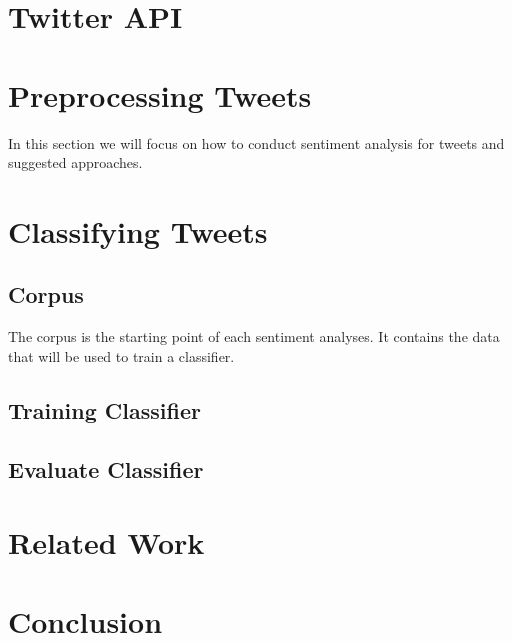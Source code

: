 \documentclass{acm_proc_article-sp}
\begin{document}
\section{Twitter API}

\section{Preprocessing Tweets}
In this section we will focus on how to conduct sentiment analysis for tweets and suggested approaches.



\section{Classifying Tweets}

\subsection{Corpus}
The corpus is the starting point of each sentiment analyses. It contains the data that will be used to train a classifier.


\subsection{Training Classifier}

\subsection{Evaluate Classifier}

\section{Related Work}


\section{Conclusion}




%

%
%
\end{document}
